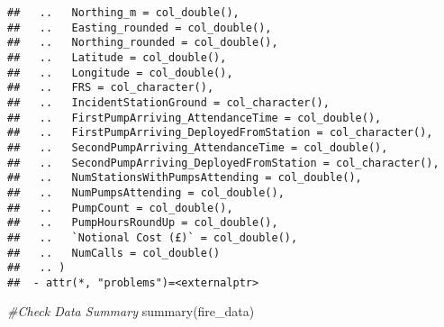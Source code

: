 \documentclass[
]{article}
\newenvironment{Shaded}{\begin{snugshade}}{\end{snugshade}}
\newcommand{\CommentTok}[1]{\textcolor[rgb]{0.56,0.35,0.01}{\textit{#1}}}
\newcommand{\FunctionTok}[1]{\textcolor[rgb]{0.00,0.00,0.00}{#1}}
\newcommand{\NormalTok}[1]{#1}
\begin{document}
\begin{verbatim}
##   ..   Northing_m = col_double(),
##   ..   Easting_rounded = col_double(),
##   ..   Northing_rounded = col_double(),
##   ..   Latitude = col_double(),
##   ..   Longitude = col_double(),
##   ..   FRS = col_character(),
##   ..   IncidentStationGround = col_character(),
##   ..   FirstPumpArriving_AttendanceTime = col_double(),
##   ..   FirstPumpArriving_DeployedFromStation = col_character(),
##   ..   SecondPumpArriving_AttendanceTime = col_double(),
##   ..   SecondPumpArriving_DeployedFromStation = col_character(),
##   ..   NumStationsWithPumpsAttending = col_double(),
##   ..   NumPumpsAttending = col_double(),
##   ..   PumpCount = col_double(),
##   ..   PumpHoursRoundUp = col_double(),
##   ..   `Notional Cost (£)` = col_double(),
##   ..   NumCalls = col_double()
##   .. )
##  - attr(*, "problems")=<externalptr>
\end{verbatim}

\begin{Shaded}
\begin{Highlighting}[]
\CommentTok{\#Check Data Summary}
\FunctionTok{summary}\NormalTok{(fire\_data)}
\end{Highlighting}
\end{Shaded}
\end{document}
